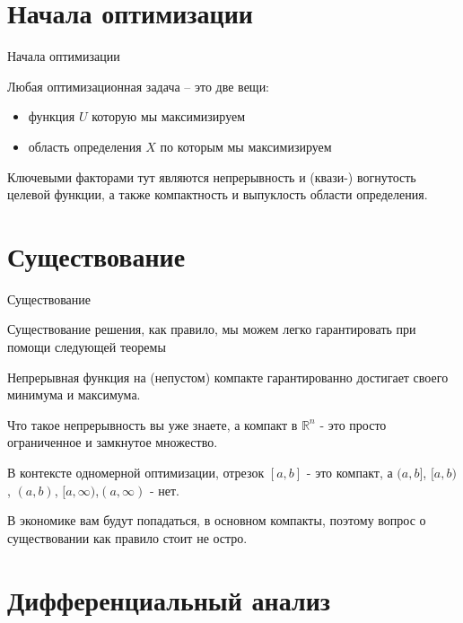 \documentclass{beamer}
\begin{document}
\section{Начала оптимизации}

\begin{frame}{Начала оптимизации}

Любая оптимизационная задача – это две вещи:

\begin{itemize}
  \item функция $U$ которую мы максимизируем
  \item область определения $X$ по которым мы максимизируем
\end{itemize}

Ключевыми факторами тут являются непрерывность и (квази-) вогнутость целевой функции, а также компактность и выпуклость области определения.

\end{frame}

\section{Существование}

\begin{frame}{Существование}

Существование решения, как правило, мы можем легко гарантировать при помощи следующей теоремы

\begin{theorem}[Вейерштрасса]

Непрерывная функция на (непустом) компакте гарантированно достигает своего минимума и максимума.
\end{theorem}

Что такое \alert{непрерывность} вы уже знаете, а \alert{компакт} в $\mathbb{R}^n$ - это просто ограниченное и замкнутое множество. 

В контексте одномерной оптимизации, отрезок $[a,b]$ - это компакт, а $(a,b]$, $[a,b)$, $(a,b)$, $[a,\infty)$,$(a,\infty)$ - нет. 

В экономике вам будут попадаться, в основном компакты, поэтому вопрос о существовании как правило стоит не остро.

\end{frame}

\section{Дифференциальный анализ}
\end{document}
